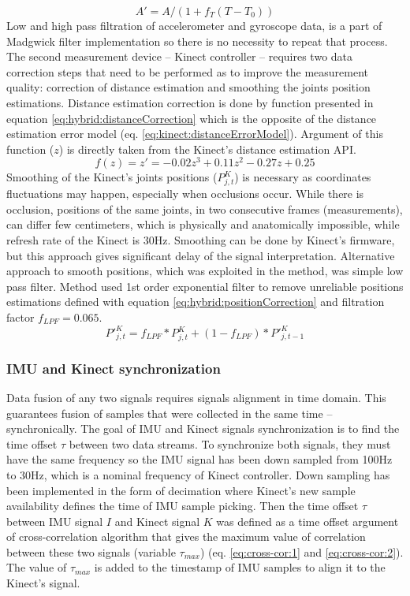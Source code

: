 \documentclass[sensors,article,submit,moreauthors,pdftex,10pt,a4paper]{mdpi}
\begin{document}
	\begin{equation}
		A'=A/(1+ f_T (T-T_0))
		\label{eq:hybrid:tempCorrection}
	\end{equation}
	Low and high pass filtration of accelerometer and gyroscope data, is a part of Madgwick filter implementation so there is no necessity to repeat that process.
	The second measurement device – Kinect controller – requires two data correction steps that need to be performed as to improve the measurement quality: correction of distance estimation and smoothing the joints position estimations. Distance estimation correction is done by function presented in equation \ref{eq:hybrid:distanceCorrection} which is the opposite of the distance estimation error model (eq. \ref{eq:kinect:distanceErrorModel}). Argument of this function ($z$) is directly taken from the Kinect’s distance estimation API.
	\begin{equation}
		f(z)=z'=-0.02z^3+0.11z^2-0.27z+0.25
		\label{eq:hybrid:distanceCorrection}
	\end{equation}
	Smoothing of the Kinect’s joints positions ($P_{j,t}^K$) is necessary as coordinates fluctuations may happen, especially when occlusions occur. While there is occlusion, positions of the same joints, in two consecutive frames (measurements), can differ few centimeters, which is physically and anatomically impossible, while refresh rate of the Kinect is 30Hz. Smoothing can be done by Kinect’s firmware, but this approach gives significant delay of the signal interpretation. Alternative approach to smooth positions, which was exploited in the method, was simple low pass filter. Method used 1st order exponential filter to remove unreliable positions estimations defined with equation \ref{eq:hybrid:positionCorrection} and filtration factor $f_{LPF} = 0.065$.
	\begin{equation}
		{P'}_{j,t}^K=f_{LPF} * P_{j,t}^K+(1-f_{LPF}) * {P'}_{j,t-1}^K
		\label{eq:hybrid:positionCorrection}
	\end{equation}
	
	\subsubsection{IMU and Kinect synchronization}
	Data fusion of any two signals requires signals alignment in time domain. This guarantees fusion of samples that were collected in the same time -- synchronically. The goal of IMU and Kinect signals synchronization is to find the time offset $\tau$ between two data streams. To synchronize both signals, they must have the same frequency so the IMU signal has been down sampled from 100Hz to 30Hz, which is a nominal frequency of Kinect controller. Down sampling has been implemented in the form of decimation where Kinect’s new sample availability defines the time of IMU sample picking. Then the time offset $\tau$ between IMU signal $I$ and Kinect signal $K$ was defined as a time offset argument of cross-correlation algorithm that gives the maximum value of correlation between these two signals (variable $\tau_{max}$) (eq. \ref{eq:cross-cor:1} and \ref{eq:cross-cor:2}). The value of $\tau_{max}$ is added to the timestamp of IMU samples to align it to the Kinect’s signal.
	
\end{document}
